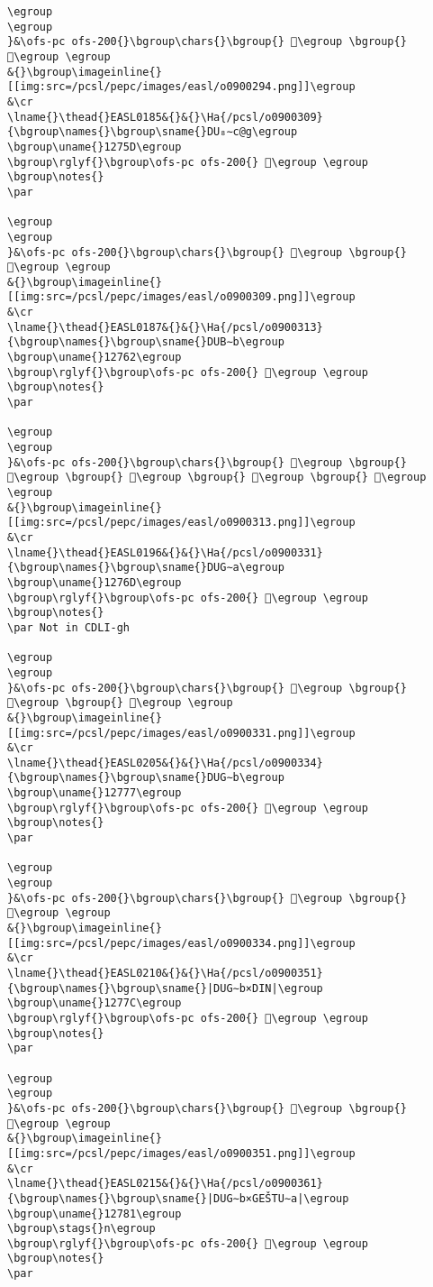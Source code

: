 \begin{verbatim}
\egroup
\egroup
}&\ofs-pc ofs-200{}\bgroup\chars{}\bgroup{} 𒝗\egroup \bgroup{} 𒝘\egroup \egroup
&{}\bgroup\imageinline{}[[img:src=/pcsl/pepc/images/easl/o0900294.png]]\egroup
&\cr
\lname{}\thead{}EASL0185&{}&{}\Ha{/pcsl/o0900309}{\bgroup\names{}\bgroup\sname{}DU₈∼c@g\egroup
\bgroup\uname{}1275D\egroup
\bgroup\rglyf{}\bgroup\ofs-pc ofs-200{} 𒝝\egroup \egroup
\bgroup\notes{}
\par 

\egroup
\egroup
}&\ofs-pc ofs-200{}\bgroup\chars{}\bgroup{} 𒝝\egroup \bgroup{} 𒝞\egroup \egroup
&{}\bgroup\imageinline{}[[img:src=/pcsl/pepc/images/easl/o0900309.png]]\egroup
&\cr
\lname{}\thead{}EASL0187&{}&{}\Ha{/pcsl/o0900313}{\bgroup\names{}\bgroup\sname{}DUB∼b\egroup
\bgroup\uname{}12762\egroup
\bgroup\rglyf{}\bgroup\ofs-pc ofs-200{} 𒝢\egroup \egroup
\bgroup\notes{}
\par 

\egroup
\egroup
}&\ofs-pc ofs-200{}\bgroup\chars{}\bgroup{} 𒝡\egroup \bgroup{} 𒝠\egroup \bgroup{} 𒝣\egroup \bgroup{} 𒝢\egroup \bgroup{} 𒝤\egroup \egroup
&{}\bgroup\imageinline{}[[img:src=/pcsl/pepc/images/easl/o0900313.png]]\egroup
&\cr
\lname{}\thead{}EASL0196&{}&{}\Ha{/pcsl/o0900331}{\bgroup\names{}\bgroup\sname{}DUG∼a\egroup
\bgroup\uname{}1276D\egroup
\bgroup\rglyf{}\bgroup\ofs-pc ofs-200{} 𒝭\egroup \egroup
\bgroup\notes{}
\par Not in CDLI-gh

\egroup
\egroup
}&\ofs-pc ofs-200{}\bgroup\chars{}\bgroup{} 𒝶\egroup \bgroup{} 𒝵\egroup \bgroup{} 𒝭\egroup \egroup
&{}\bgroup\imageinline{}[[img:src=/pcsl/pepc/images/easl/o0900331.png]]\egroup
&\cr
\lname{}\thead{}EASL0205&{}&{}\Ha{/pcsl/o0900334}{\bgroup\names{}\bgroup\sname{}DUG∼b\egroup
\bgroup\uname{}12777\egroup
\bgroup\rglyf{}\bgroup\ofs-pc ofs-200{} 𒝷\egroup \egroup
\bgroup\notes{}
\par 

\egroup
\egroup
}&\ofs-pc ofs-200{}\bgroup\chars{}\bgroup{} 𒞭\egroup \bgroup{} 𒝷\egroup \egroup
&{}\bgroup\imageinline{}[[img:src=/pcsl/pepc/images/easl/o0900334.png]]\egroup
&\cr
\lname{}\thead{}EASL0210&{}&{}\Ha{/pcsl/o0900351}{\bgroup\names{}\bgroup\sname{}|DUG∼b×DIN|\egroup
\bgroup\uname{}1277C\egroup
\bgroup\rglyf{}\bgroup\ofs-pc ofs-200{} 𒝼\egroup \egroup
\bgroup\notes{}
\par 

\egroup
\egroup
}&\ofs-pc ofs-200{}\bgroup\chars{}\bgroup{} 𒞯\egroup \bgroup{} 𒝼\egroup \egroup
&{}\bgroup\imageinline{}[[img:src=/pcsl/pepc/images/easl/o0900351.png]]\egroup
&\cr
\lname{}\thead{}EASL0215&{}&{}\Ha{/pcsl/o0900361}{\bgroup\names{}\bgroup\sname{}|DUG∼b×GEŠTU∼a|\egroup
\bgroup\uname{}12781\egroup
\bgroup\stags{}n\egroup
\bgroup\rglyf{}\bgroup\ofs-pc ofs-200{} 𒞁\egroup \egroup
\bgroup\notes{}
\par 


\end{verbatim}
